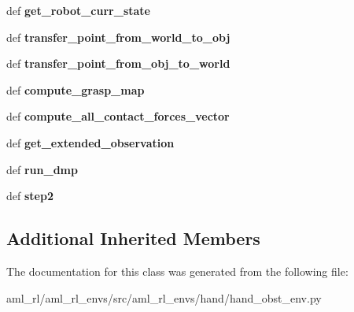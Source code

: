 \begin{DoxyCompactItemize}
\item 
\hypertarget{classaml__rl__envs_1_1hand_1_1hand__obst__env_1_1_hand_obstacle_env_aaab9a9871fad7398575db06a11a6e84f}{def {\bfseries get\-\_\-robot\-\_\-curr\-\_\-state}}\label{classaml__rl__envs_1_1hand_1_1hand__obst__env_1_1_hand_obstacle_env_aaab9a9871fad7398575db06a11a6e84f}

\item 
\hypertarget{classaml__rl__envs_1_1hand_1_1hand__obst__env_1_1_hand_obstacle_env_adef8222c83bb1b42e205132f253caec6}{def {\bfseries transfer\-\_\-point\-\_\-from\-\_\-world\-\_\-to\-\_\-obj}}\label{classaml__rl__envs_1_1hand_1_1hand__obst__env_1_1_hand_obstacle_env_adef8222c83bb1b42e205132f253caec6}

\item 
\hypertarget{classaml__rl__envs_1_1hand_1_1hand__obst__env_1_1_hand_obstacle_env_af8cfd3b051c04d8b6522bc069bc4c311}{def {\bfseries transfer\-\_\-point\-\_\-from\-\_\-obj\-\_\-to\-\_\-world}}\label{classaml__rl__envs_1_1hand_1_1hand__obst__env_1_1_hand_obstacle_env_af8cfd3b051c04d8b6522bc069bc4c311}

\item 
\hypertarget{classaml__rl__envs_1_1hand_1_1hand__obst__env_1_1_hand_obstacle_env_a6456f85e733d3c75da4f0e760b311d2e}{def {\bfseries compute\-\_\-grasp\-\_\-map}}\label{classaml__rl__envs_1_1hand_1_1hand__obst__env_1_1_hand_obstacle_env_a6456f85e733d3c75da4f0e760b311d2e}

\item 
\hypertarget{classaml__rl__envs_1_1hand_1_1hand__obst__env_1_1_hand_obstacle_env_aba33120278817644195d4b9f0ac961ea}{def {\bfseries compute\-\_\-all\-\_\-contact\-\_\-forces\-\_\-vector}}\label{classaml__rl__envs_1_1hand_1_1hand__obst__env_1_1_hand_obstacle_env_aba33120278817644195d4b9f0ac961ea}

\item 
\hypertarget{classaml__rl__envs_1_1hand_1_1hand__obst__env_1_1_hand_obstacle_env_a771b3a05ce3ab3f9d5d1a0a6f1323afd}{def {\bfseries get\-\_\-extended\-\_\-observation}}\label{classaml__rl__envs_1_1hand_1_1hand__obst__env_1_1_hand_obstacle_env_a771b3a05ce3ab3f9d5d1a0a6f1323afd}

\item 
\hypertarget{classaml__rl__envs_1_1hand_1_1hand__obst__env_1_1_hand_obstacle_env_a2c64707728c936257d11d762137543e6}{def {\bfseries run\-\_\-dmp}}\label{classaml__rl__envs_1_1hand_1_1hand__obst__env_1_1_hand_obstacle_env_a2c64707728c936257d11d762137543e6}

\item 
\hypertarget{classaml__rl__envs_1_1hand_1_1hand__obst__env_1_1_hand_obstacle_env_a98de9243e233ab7ef9780f08f709d6bc}{def {\bfseries step2}}\label{classaml__rl__envs_1_1hand_1_1hand__obst__env_1_1_hand_obstacle_env_a98de9243e233ab7ef9780f08f709d6bc}

\end{DoxyCompactItemize}
\subsection*{Additional Inherited Members}


The documentation for this class was generated from the following file\-:\begin{DoxyCompactItemize}
\item 
aml\-\_\-rl/aml\-\_\-rl\-\_\-envs/src/aml\-\_\-rl\-\_\-envs/hand/hand\-\_\-obst\-\_\-env.\-py\end{DoxyCompactItemize}
